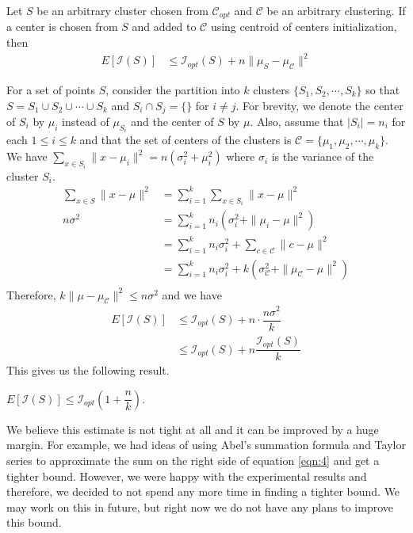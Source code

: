 \documentclass[twoside, 11pt]{article}
\newcommand{\C}{\mathcal{C}}
\newcommand{\I}{\mathcal{I}}
\begin{document}
		\begin{theorem}
			Let $S$ be an arbitrary cluster chosen from $\C_{opt}$ and $\C$ be an arbitrary clustering. If a center is chosen from $S$ and added to $\C$ using centroid of centers initialization, then
				\begin{align*}
					E[\I(S)] & \leq \I_{opt}(S)+n\|\mu_{S}-\mu_{\C}\|^2
				\end{align*}
		\end{theorem}
	For a set of points $S$, consider the partition into $k$ clusters $\{S_1,S_2,\cdots,S_k\}$ so that $S=S_1\cup S_2\cup\cdots\cup S_k$ and $S_i\cap S_j=\{\}$ for $i\neq j$. For brevity, we denote the center of $S_i$ by $\mu_i$ instead of $\mu_{S_i}$ and the center of $S$ by $\mu$. Also, assume that $|S_i|=n_i$ for each $1\leq i\leq k$ and that the set of centers of the clusters is $\mathcal{C}=\{\mu_1,\mu_2,\cdots,\mu_k\}$. We have $\sum_{x\in S_i}\|x-\mu_i\|^2 = n(\sigma_i^2+\mu_i^2)$ where $\sigma_i$ is the variance of the cluster $S_i$.
		\begin{align}
			\sum_{x\in S}\|x-\mu\|^2 
				& = \sum_{i=1}^k\sum_{x\in S_i}\|x-\mu\|^2\nonumber\\
			n\sigma^2
				& = \sum_{i=1}^kn_i(\sigma_i^2+\|\mu_i-\mu\|^2)\nonumber\\
				& = \sum_{i=1}^kn_i\sigma_i^2+\sum_{c\in\C}\|c-\mu\|^2\nonumber\\
				& = \sum_{i=1}^kn_i\sigma_i^2+k(\sigma_{\C}^2+\|\mu_{\C}-\mu\|^2)\label{eqn:4}\\
		\end{align}
	Therefore, $k\|\mu-\mu_{\C}\|^2\leq n\sigma^2$ and we have
		\begin{align*}
			E[\I(S)] & \leq \I_{opt}(S)+n\cdot\dfrac{n\sigma^2}{k}\\
					 & \leq \I_{opt}(S)+n\dfrac{\I_{opt}(S)}{k}
		\end{align*}
	This gives us the following result.
		\begin{theorem}
			$E[\I(S)]\leq \I_{opt}\left(1+\dfrac{n}{k}\right)$.
		\end{theorem}
	We believe this estimate is not tight at all and it can be improved by a huge margin. For example, we had ideas of using Abel's summation formula \citep[Theorem $4.2$]{apostol} and Taylor series to approximate the sum on the right side of equation \eqref{eqn:4} and get a tighter bound. However, we were happy with the experimental results and therefore, we decided to not spend any more time in finding a tighter bound. We may work on this in future, but right now we do not have any plans to improve this bound.
\end{document}
